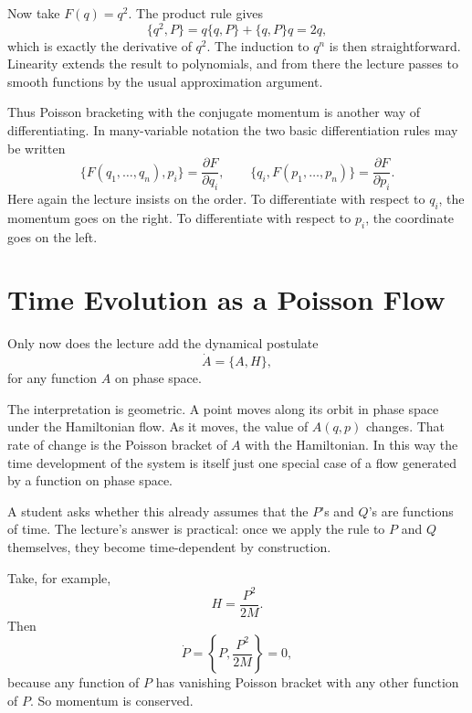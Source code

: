 Now take \(F(q)=q^2\). The product rule gives
\begin{equation}
\{q^2,P\}=q\{q,P\}+\{q,P\}q=2q,
\end{equation}
which is exactly the derivative of \(q^2\). The induction to \(q^n\) is then straightforward. Linearity extends the result to polynomials, and from there the lecture passes to smooth functions by the usual approximation argument.

Thus Poisson bracketing with the conjugate momentum is another way of differentiating. In many-variable notation the two basic differentiation rules may be written
\begin{equation}
\{F(q_1,\dots,q_n),p_i\}=\frac{\partial F}{\partial q_i},
\qquad
\{q_i,F(p_1,\dots,p_n)\}=\frac{\partial F}{\partial p_i}.
\end{equation}
Here again the lecture insists on the order. To differentiate with respect to \(q_i\), the momentum goes on the right. To differentiate with respect to \(p_i\), the coordinate goes on the left.

\section{Time Evolution as a Poisson Flow}

Only now does the lecture add the dynamical postulate
\begin{equation}
\dot A=\{A,H\},
\end{equation}
for any function \(A\) on phase space.

The interpretation is geometric. A point moves along its orbit in phase space under the Hamiltonian flow. As it moves, the value of \(A(q,p)\) changes. That rate of change is the Poisson bracket of \(A\) with the Hamiltonian. In this way the time development of the system is itself just one special case of a flow generated by a function on phase space.

A student asks whether this already assumes that the \(P\)'s and \(Q\)'s are functions of time. The lecture's answer is practical: once we apply the rule to \(P\) and \(Q\) themselves, they become time-dependent by construction.

Take, for example,
\begin{equation}
H=\frac{P^2}{2M}.
\end{equation}
Then
\begin{equation}
\dot P=\left\{P,\frac{P^2}{2M}\right\}=0,
\end{equation}
because any function of \(P\) has vanishing Poisson bracket with any other function of \(P\). So momentum is conserved.

